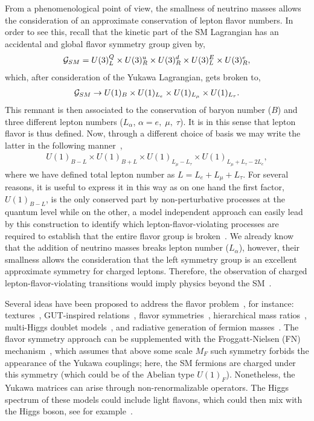 \documentclass[aps,prd,groupaddress,floatfix,tighten,nofootinbib,showpacs,
amsfonts,superscriptaddress]{revtex4}
\begin{document}
From a phenomenological point of view, the smallness of neutrino masses allows the consideration of an approximate conservation of lepton flavor numbers. In order to see this, recall that
the kinetic part of the SM Lagrangian has an accidental and global flavor symmetry group given by,
%
\begin{eqnarray}
	{\cal G}_{SM} = U(3)^Q_L \times U(3)^u_R \times U(3)^d_R \times U(3)^E_L \times U(3)^e_R, 
\end{eqnarray}
which, after consideration of the Yukawa Lagrangian, gets broken to,
\begin{eqnarray}
	{\cal G}_{SM} \rightarrow U(1)_B \times U(1)_{L_e} \times U(1)_{L_\mu} \times U(1)_{L_\tau}.
\end{eqnarray}
%
This remnant is then associated to the conservation of baryon number ($B$) and three different lepton numbers ($L_\alpha$, $\alpha = e,\; \mu,\; \tau$). It is in this sense that lepton flavor is thus defined. Now, through a different choice
of basis we may write the latter in the following manner~\cite{Heeck:2016xwg},
%
\begin{eqnarray}
	U(1)_{B-L} \times U(1)_{B+L} \times U(1)_{L_\mu - L_\tau} \times U(1)_{L_\mu + L_\tau - 2L_e},
\end{eqnarray} 
%
where we have defined total lepton number as $L=L_e + L_\mu + L_\tau$. 
For several reasons, it is useful to express it in this way as on one hand the first factor,
$U(1)_{B-L}$, is the only conserved part by non-perturbative processes at the quantum level while on the
other, a model independent approach can easily lead by this construction to identify which
lepton-flavor-violating processes are required to establish that the entire flavor group is broken~\cite{Heeck:2016xwg}. We already know that the addition of neutrino masses breaks
lepton number ($L_\alpha$), however, their smallness allows the consideration that the left symmetry group is an
excellent approximate symmetry for charged leptons. Therefore, the observation of charged lepton-flavor-violating transitions would imply physics beyond the SM~\cite{Heeck:2016xwg}.

 Several ideas have been proposed to {address} the flavor problem~\cite{Isidori:2010kg}, for instance: 
textures~\cite{Fritzsch:1977vd,Fritzsch:1977za,Fritzsch:1979zq},  GUT-inspired relations~\cite{Georgi:1979df,King:2013hj}, flavor symmetries~\cite{Fritzsch:1999ee,Ishimori:2010au}, {hierarchical mass ratios~\cite{Hollik:2014jda,Saldana-Salazar:2016pms}}, {multi-Higgs doublet models~\cite{Blechman:2010cs}}, and radiative generation of fermion masses~\cite{Balakrishna:1988ks,Babu:1989fg,Ma:1998dn,DiazCruz:2005qz}. 
The flavor symmetry approach can be supplemented with the {Froggatt}-Nielsen (FN) mechanism~\cite{Froggatt:1978nt}, which
assumes that above some scale $M_F$ such symmetry forbids the appearance of the Yukawa couplings; here, the
SM fermions are charged under this symmetry (which could be of the Abelian type $U(1)_F$).
Nonetheless, the Yukawa matrices can arise  through non-renormalizable operators. 
The Higgs spectrum of these models could include light flavons, which could then mix with
the Higgs boson, {see for example~\cite{Diaz-Cruz:2014pla}}. 
\end{document}
